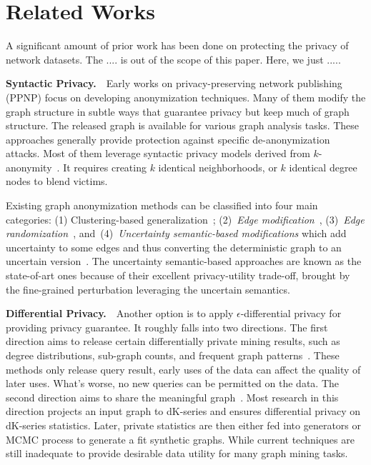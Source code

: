 \section{Related Works}
A significant amount of prior work has been done on protecting the privacy of network datasets.
The .... is out of the scope of this paper. Here, we just ..... 

\textbf{Syntactic Privacy.}~~Early works on privacy-preserving network publishing (PPNP) focus on developing anonymization techniques. Many of them modify the graph structure in subtle ways that guarantee privacy but keep much of graph structure.  The released graph is available for various graph analysis tasks. These approaches generally provide protection against specific de-anonymization attacks. Most of them leverage syntactic privacy models derived from $k$-anonymity~\cite{Sweeney:2002:KAM:774544.774552}. It requires creating $k$ identical neighborhoods, or $k$ identical degree nodes to blend victims. 

Existing graph anonymization methods can be classified into four main categories: (1) Clustering-based generalization~\cite{Hay_Anonymizing_2007,Bhagat_Class_2009,hay2010resisting}; (2)~{\em Edge modification}~\cite{Liu_Towards_2008, Zhou_Preserving_2008, Wang2011, Wu_k_2010, Skarkala_Privacy_2012}, 
(3)~{\em Edge randomization}~\cite{Liu_Privacy_2009,Ying_Randomizing_2008, Ninggal_Utility_2015},
and~(4)~{\em Uncertainty semantic-based modifications} which add uncertainty to some edges and thus converting the deterministic graph to an uncertain version~\cite{Boldi_Injecting_2012, Nguyen_Anonymizing_2015}. The uncertainty semantic-based approaches are known as the state-of-art ones because of their excellent privacy-utility trade-off, brought by the fine-grained perturbation leveraging the uncertain semantics. 

 
\textbf{Differential Privacy.}~~Another option is to apply $\epsilon$-differential privacy for providing privacy guarantee. It roughly falls into two directions. The first direction aims to release certain differentially private mining results, such as degree distributions, sub-graph counts, and frequent graph patterns~\cite{Xiao_Differentially_2014,Day:2016}. These methods only release query result, early uses of the data can affect the quality of later uses. What's worse, no new queries can be permitted on the data. The second direction aims to share the meaningful graph~\cite{Sala_Sharing_2011}. Most research in this direction projects an input graph to dK-series and ensures differential privacy on dK-series statistics. Later, private statistics are then either fed into generators or MCMC process to generate a fit synthetic graphs. While current techniques are still inadequate to provide desirable data utility for many graph mining tasks. 

